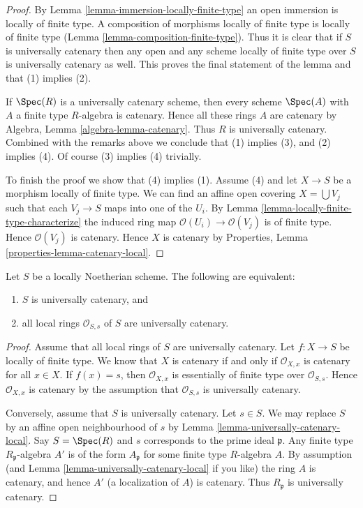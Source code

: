 \begin{proof}
By Lemma \ref{lemma-immersion-locally-finite-type} an open immersion
is locally of finite type. A composition of morphisms locally of
finite type is locally of finite type
(Lemma \ref{lemma-composition-finite-type}). Thus it is clear that if $S$ is
universally catenary then any open and any scheme locally of finite
type over $S$ is universally catenary as well. This proves the final
statement of the lemma and that (1) implies (2).

\medskip\noindent
If $\Spec(R)$ is a universally catenary scheme, then every
scheme $\Spec(A)$ with $A$ a finite type $R$-algebra is
catenary. Hence all these rings $A$ are catenary by
Algebra, Lemma \ref{algebra-lemma-catenary}.
Thus $R$ is universally catenary. Combined with the remarks above we
conclude that (1) implies (3), and (2) implies (4). Of course
(3) implies (4) trivially.

\medskip\noindent
To finish the proof we show that (4) implies (1).
Assume (4) and let $X \to S$ be a morphism locally of finite type.
We can find an affine open covering $X = \bigcup V_j$ such that
each $V_j \to S$ maps into one of the $U_i$. By
Lemma \ref{lemma-locally-finite-type-characterize}
the induced ring map $\mathcal{O}(U_i) \to \mathcal{O}(V_j)$ is
of finite type. Hence $\mathcal{O}(V_j)$ is catenary. Hence
$X$ is catenary by Properties, Lemma \ref{properties-lemma-catenary-local}.
\end{proof}

\begin{lemma}
\label{lemma-universally-catenary-local-rings-universally-catenary}
Let $S$ be a locally Noetherian scheme.
The following are equivalent:
\begin{enumerate}
\item $S$ is universally catenary, and
\item all local rings $\mathcal{O}_{S, s}$ of $S$ are universally catenary.
\end{enumerate}
\end{lemma}

\begin{proof}
Assume that all local rings of $S$ are universally catenary.
Let $f : X \to S$ be locally of finite type.
We know that $X$ is catenary if and only if $\mathcal{O}_{X, x}$ is
catenary for all $x \in X$. If $f(x) = s$, then $\mathcal{O}_{X, x}$
is essentially of finite type over $\mathcal{O}_{S, s}$. Hence
$\mathcal{O}_{X, x}$ is catenary by the assumption that
$\mathcal{O}_{S, s}$ is universally catenary.

\medskip\noindent
Conversely, assume that $S$ is universally catenary. Let $s \in S$.
We may replace $S$ by an affine open neighbourhood of $s$ by
Lemma \ref{lemma-universally-catenary-local}. Say $S = \Spec(R)$
and $s$ corresponds to the prime ideal $\mathfrak p$. Any finite
type $R_{\mathfrak p}$-algebra $A'$ is of the form
$A_{\mathfrak p}$ for some finite type $R$-algebra $A$.
By assumption (and Lemma \ref{lemma-universally-catenary-local} if you like)
the ring $A$ is catenary, and hence $A'$ (a localization of $A$) is
catenary. Thus $R_{\mathfrak p}$ is universally catenary.
\end{proof}

